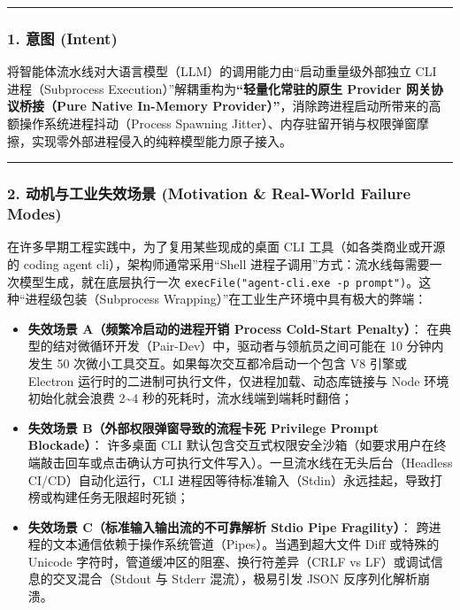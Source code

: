 \begin{center}\rule{0.5\linewidth}{0.5pt}\end{center}

\subsubsection{1. 意图 (Intent)}\label{ux610fux56fe-intent-21}

将智能体流水线对大语言模型（LLM）的调用能力由``启动重量级外部独立 CLI
进程（Subprocess Execution）''解耦重构为\textbf{``轻量化常驻的原生
Provider 网关协议桥接（Pure Native In-Memory
Provider）''}，消除跨进程启动所带来的高额操作系统进程抖动（Process
Spawning
Jitter）、内存驻留开销与权限弹窗摩擦，实现零外部进程侵入的纯粹模型能力原子接入。

\begin{center}\rule{0.5\linewidth}{0.5pt}\end{center}

\subsubsection{2. 动机与工业失效场景 (Motivation \& Real-World Failure
Modes)}\label{ux52a8ux673aux4e0eux5de5ux4e1aux5931ux6548ux573aux666f-motivation-real-world-failure-modes-21}

在许多早期工程实践中，为了复用某些现成的桌面 CLI
工具（如各类商业或开源的 coding agent cli），架构师通常采用``Shell
进程子调用''方式：流水线每需要一次模型生成，就在底层执行一次
\texttt{execFile("agent-cli.exe\ -p\ \textquotesingle{}prompt\textquotesingle{}")}。这种``进程级包装（Subprocess
Wrapping）''在工业生产环境中具有极大的弊端：

\begin{itemize}
\tightlist
\item
  \textbf{失效场景 A（频繁冷启动的进程开销 Process Cold-Start
  Penalty）}：
  在典型的结对微循环开发（Pair-Dev）中，驱动者与领航员之间可能在 10
  分钟内发生 50 次微小工具交互。如果每次交互都冷启动一个包含 V8 引擎或
  Electron 运行时的二进制可执行文件，仅进程加载、动态库链接与 Node
  环境初始化就会浪费 2\textasciitilde4
  秒的死耗时，流水线端到端耗时翻倍；
\item
  \textbf{失效场景 B（外部权限弹窗导致的流程卡死 Privilege Prompt
  Blockade）}： 许多桌面 CLI
  默认包含交互式权限安全沙箱（如要求用户在终端敲击回车或点击确认方可执行文件写入）。一旦流水线在无头后台（Headless
  CI/CD）自动化运行，CLI
  进程因等待标准输入（Stdin）永远挂起，导致打榜或构建任务无限超时死锁；
\item
  \textbf{失效场景 C（标准输入输出流的不可靠解析 Stdio Pipe
  Fragility）}：
  跨进程的文本通信依赖于操作系统管道（Pipes）。当遇到超大文件 Diff
  或特殊的 Unicode 字符时，管道缓冲区的阻塞、换行符差异（CRLF vs
  LF）或调试信息的交叉混合（Stdout 与 Stderr 混流），极易引发 JSON
  反序列化解析崩溃。
\end{itemize}

